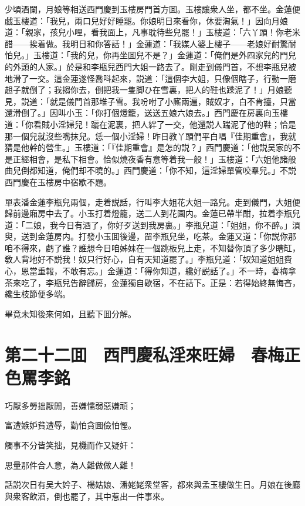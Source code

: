 少頃酒闌，月娘等相送西門慶到玉樓房門首方囬。玉樓讓衆人坐，都不坐。金蓮便戯玉樓道：「我兒，兩口兒好好睡罷。你娘明日來看你，休要淘氣！」因向月娘道：「親家，孩兒小哩，看我面上，凡事耽待些兒罷！」玉樓道：「六丫頭！你老米醋——挨着做。我明日和你答話！」金蓮道：「我媒人婆上樓子——老娘好耐驚耐怕兒。」玉樓道：「我的兒，你再坐囬兒不是？」金蓮道：「俺們是外四家兒的門兒的外頭的人家。」於是和李瓶兒西門大姐一路去了。剛走到儀門首，不想李瓶兒被地滑了一交。這金蓮遂怪喬呌起來，説道：「這個李大姐，只像個瞎子，行動一磨趄子就倒了；我搊你去，倒把我一隻脚ひ在雪裏，把人的鞋也䠕泥了！」月娘聽見，説道：「就是儀門首那堆子雪。我吩咐了小廝兩遍，賊奴才，白不肯擡，只當還滑倒了。」因叫小玉：「你打個燈籠，送送五娘六娘去。」西門慶在房裏向玉樓道：「你看賊小淫婦兒！躧在泥裏，把人絆了一交，他還説人踹泥了他的鞋；恰是那一個兒就沒些嘴抹兒。恁一個小淫婦！昨日教丫頭們平白唱『佳期重會』，我就猜是他幹的營生。」玉樓道：「『佳期重會』是怎的説？」西門慶道：「他説吴家的不是正經相會，是私下相會。恰似燒夜香有意等着我一般！」玉樓道：「六姐他諸般曲兒倒都知道，俺們却不曉的。」西門慶道：「你不知，這淫婦單管咬羣兒。」不説西門慶在玉樓房中宿歇不題。

單表潘金蓮李瓶兒兩個，走着説話，行叫李大姐花大姐一路兒。走到儀門，大姐便歸前邊廂房中去了。小玉打着燈籠，送二人到花園内。金蓮已帶半酣，拉着李瓶兒道：「二娘，我今日有酒了，你好歹送到我房裏。」李瓶兒道：「姐姐，你不醉。」湏臾，送到金蓮房内。打發小玉囬後邊，㽞李瓶兒坐，吃茶。金蓮又道：「你説你那咱不得來，虧了誰？誰想今日咱姊妹在一個跳板兒上走，不知替你頂了多少瞎缸，敎人背地好不説我！奴只行好心，自有天知道罷了。」李瓶兒道：「奴知道姐姐費心，恩當重報，不敢有忘。」金蓮道：「得你知道，纔好説話了。」不一時，春梅拿茶來吃了，李瓶兒告辭歸房，金蓮獨自歇宿，不在話下。正是：若得始終無悔吝，纔生枝節便多端。

畢竟未知後來何如，且聽下囬分解。

\chapter*{第二十二囬　西門慶私淫來旺婦　春梅正色罵李銘}

巧厭多勞拙厭閒，善嫌懦弱惡嫌頑；

富遭嫉妒貧遭辱，勤怕貪圖儉怕慳。

觸事不分皆笑拙，見機而作又疑奸：

思量那件合人意，為人難做做人難！

話説次日有吴大妗子、楊姑娘、潘姥姥衆堂客，都來與孟玉樓做生日。月娘在後廳與衆客飲酒，倒也罷了，其中惹出一件事來。

